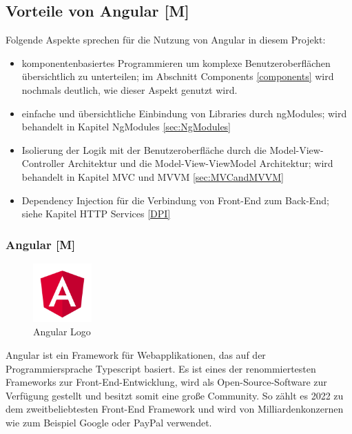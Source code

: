\subsection{Vorteile von Angular [M]}
Folgende Aspekte sprechen für die Nutzung von Angular in diesem Projekt:

\begin{itemize}
  \item komponentenbasiertes Programmieren um komplexe Benutzeroberflächen übersichtlich zu unterteilen;
  im Abschnitt Components \ref{components} wird nochmals deutlich, wie dieser Aspekt genutzt wird.
  \item einfache und übersichtliche Einbindung von Libraries durch ngModules; wird behandelt in Kapitel NgModules \ref{sec:NgModules} 
  \item Isolierung der Logik mit der Benutzeroberfläche durch die Model-View-Controller Architektur und die Model-View-ViewModel Architektur; wird behandelt in Kapitel MVC und MVVM \ref{sec:MVCandMVVM} 
  \item 
  Dependency Injection für die Verbindung von Front-End zum Back-End; siehe Kapitel HTTP Services \ref{DPI}
\end{itemize}

\subsubsection{Angular [M]}
\begin{figure}
  \begin{center}
    \includegraphics[width=0.2\textwidth]{pics/AngularLogo.png}
   \caption{Angular Logo}
  \end{center}
\end{figure}
Angular ist ein Framework für Webapplikationen, das auf der Programmiersprache Typescript basiert. Es ist eines der renommiertesten Frameworks zur Front-End-Entwicklung, wird als Open-Source-Software zur Verfügung gestellt und besitzt somit eine große Community. So zählt es 2022 zu dem zweitbeliebtesten Front-End Framework \cite{AngularEvidence} und wird von Milliardenkonzernen wie zum Beispiel Google oder PayPal verwendet. 
\cite{AngularEvidence2}

